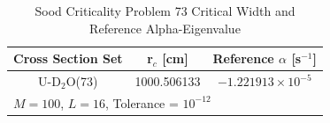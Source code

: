 \begin{table}[!htbp]
\caption{Sood Criticality Problem 73 Critical Width and Reference Alpha-Eigenvalue \cite{sood2003analytical}}
	\label{table:Sood73Ref}
	\begin{subtable}[h]{1.0\textwidth}
	\centering{}
	\begin{tabular}{@{}ccc@{}}\toprule
	Cross Section Set & r$_{c}$ [cm] & Reference $\alpha$ [s$^{-1}$] \\
	\midrule
	U-D$_{2}$O(73) & 1000.506133 & $-1.221913 \times 10^{-5}$ \\
	\bottomrule
	\multicolumn{3}{l}{$M = 100$, $L = 16$, Tolerance = $10^{-12}$} \\
	\end{tabular}
	\end{subtable}%
\end{table}

